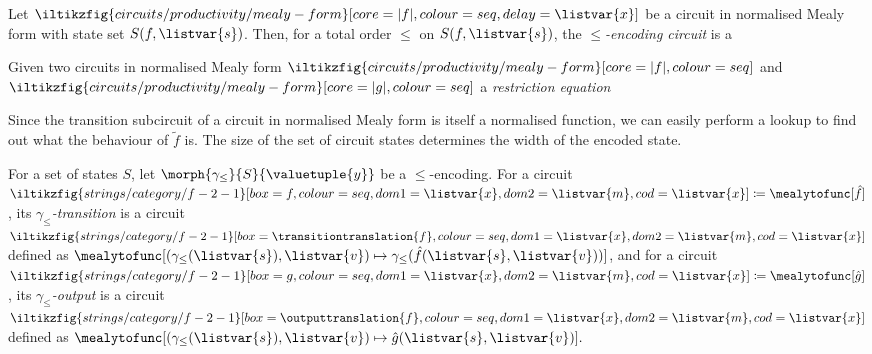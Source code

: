 \begin{definition}
    Let \(
    \iltikzfig{circuits/productivity/mealy-form}[core=|f|,colour=seq,delay=\listvar{x}]
    \) be a circuit in normalised Mealy form with state set \(S(f, \listvar{s})\).
    Then, for a total order \(\leq\) on \(S(f, \listvar{s})\), the
    \emph{\(\leq\)-encoding circuit} is a
\end{definition}

\begin{definition}

\end{definition}



\begin{definition}
    Given two circuits in normalised Mealy form \(
    \iltikzfig{circuits/productivity/mealy-form}[core=|f|,colour=seq]
    \) and \(
    \iltikzfig{circuits/productivity/mealy-form}[core=|g|,colour=seq]
    \)  a \emph{restriction equation}
\end{definition}

Since the transition subcircuit of a circuit in normalised Mealy form is itself
a normalised function, we can easily perform a lookup to find out what the
behaviour of \(\tilde{f}\) is.
The size of the set of circuit states determines the width of the encoded state.

\begin{definition}[Translations]
    For a set of states \(S\), let \(\morph{\gamma_\leq}{S}{\valuetuple{y}}\) be
    a \(\leq\)-encoding.
    For a circuit \(
    \iltikzfig{strings/category/f-2-1}[box=f, colour=seq, dom1=\listvar{x}, dom2=\listvar{m}, cod=\listvar{x}]
    \coloneqq
    \mealytofunc[\hat{f}]
    \), its \emph{\(\gamma_\leq\)-transition} is a circuit \(
    \iltikzfig{strings/category/f-2-1}[box=\transitiontranslation{f}, colour=seq, dom1=\listvar{x}, dom2=\listvar{m}, cod=\listvar{x}]
    \) defined as \(
    \mealytofunc[
        \left(\gamma_\leq(\listvar{s}),\listvar{v}\right)
        \mapsto \gamma_\leq(\hat{f}(\listvar{s}, \listvar{v}))
    ]
    \), and for a circuit \(
    \iltikzfig{strings/category/f-2-1}[box=g, colour=seq, dom1=\listvar{x}, dom2=\listvar{m}, cod=\listvar{x}]
    \coloneqq
    \mealytofunc[\hat{g}]
    \), its \emph{\(\gamma_\leq\)-output} is a circuit \(
    \iltikzfig{strings/category/f-2-1}[box=\outputtranslation{f}, colour=seq, dom1=\listvar{x}, dom2=\listvar{m}, cod=\listvar{x}]
    \) defined as \(
    \mealytofunc[
        \left(\gamma_\leq(\listvar{s}),\listvar{v}\right)
        \mapsto \hat{g}(\listvar{s}, \listvar{v})
    ].
    \)
\end{definition}

